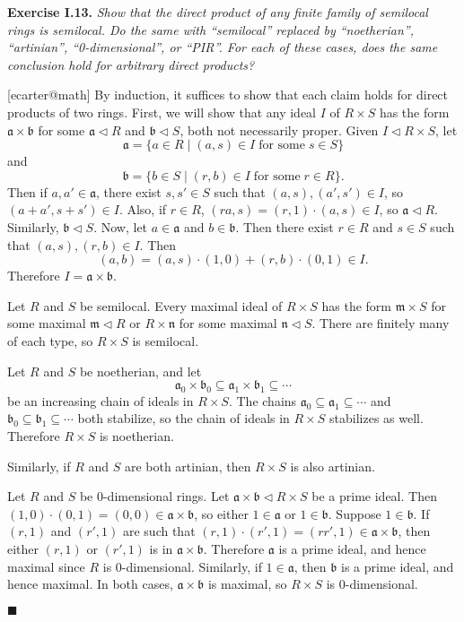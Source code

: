 \documentclass{article}
\makeatletter
\newcommand\<{\triangleleft}
\renewcommand{\a}{\ensuremath{\mathfrak{a}}}
\newcommand{\m}{\ensuremath{\mathfrak{m}}}
\newenvironment{exercise}[1]{\gdef\currentEx{#1}\begin{trivlist}\item[]%
                \textbf{Exercise #1.} \it}{\end{trivlist}}
\newenvironment{solution}[1]{\def\x{#1}\begin{trivlist}\item[]\hspace*{-.5em}[\x]}
                {\hspace*{\fill} $\blacksquare$
                \protected@write0{}{\currentEx, \x}
                \end{trivlist}}
\makeatother
\begin{document}
 \begin{exercise}{I.13}
  Show that the direct product of any finite family of semilocal rings is semilocal.  Do
  the same with ``semilocal'' replaced by ``noetherian'', ``artinian'', ``0-dimensional'',
  or ``PIR''.  For each of these cases, does the same conclusion hold for \emph{arbitrary}
  direct products?
 \end{exercise}

 \begin{solution}{ecarter@math}
   By induction, it suffices to show that each claim holds for direct products of two
   rings.  First, we will show that any ideal $I$ of $R\times S$ has the form
   $\a\times\mathfrak{b}$ for some $\a\< R$ and $\mathfrak{b}\< S$, both not
   necessarily proper.  Given $I\< R\times S$, let
   \[
           \a=\{ a\in R\mid (a,s)\in I\;\text{for some}\; s\in S\}
   \]
   and
   \[
           \mathfrak{b} = \{b\in S\mid (r,b)\in I\;\text{for some}\; r\in R\}.
   \]
   Then if $a,a'\in\a$, there exist $s,s'\in S$ such that $(a,s),(a',s')\in I$,
   so $(a+a',s+s')\in I$.  Also, if $r\in R$, $(ra,s)=(r,1)\cdot (a,s)\in I$, so
   $\a\< R$.  Similarly, $\mathfrak{b}\< S$.  Now, let $a\in\a$ and
   $b\in\mathfrak{b}$.  Then there exist $r\in R$ and $s\in S$ such that
   $(a,s),(r,b)\in I$.  Then
   \[
           (a,b) = (a,s)\cdot (1,0) + (r,b)\cdot (0,1) \in I.
   \]
   Therefore $I=\a\times\mathfrak{b}$.

   Let $R$ and $S$ be semilocal.  Every maximal ideal of $R\times S$ has the form
   $\m\times S$ for some maximal $\m\< R$ or $R\times\mathfrak{n}$ for some maximal
   $\mathfrak{n}\< S$.  There are finitely many of each type, so $R\times S$ is
   semilocal.

   Let $R$ and $S$ be noetherian, and let
   \[
           \a_0\times\mathfrak{b}_0
                   \subseteq \a_1\times\mathfrak{b}_1
                   \subseteq\cdots
   \]
   be an increasing chain of ideals in $R\times S$.  The chains
   $\a_0\subseteq\a_1\subseteq\cdots$ and
   $\mathfrak{b}_0\subseteq\mathfrak{b}_1\subseteq\cdots$ both stabilize,
   so the chain of ideals in $R\times S$ stabilizes as well.  Therefore $R\times S$ is
   noetherian.

   Similarly, if $R$ and $S$ are both artinian, then $R\times S$ is also artinian.

   Let $R$ and $S$ be 0-dimensional rings.  Let $\a\times\mathfrak{b}\< R\times S$ be
   a prime ideal.  Then $(1,0)\cdot (0,1)=(0,0)\in\a\times\mathfrak{b}$, so either
   $1\in\a$ or $1\in\mathfrak{b}$.  Suppose $1\in\mathfrak{b}$.  If $(r,1)$ and
   $(r',1)$ are such that $(r,1)\cdot (r',1)=(rr',1)\in\a\times\mathfrak{b}$, then
   either $(r,1)$ or $(r',1)$ is in $\a\times\mathfrak{b}$.  Therefore $\a$ is a
   prime ideal, and hence maximal since $R$ is 0-dimensional.  Similarly, if
   $1\in\a$, then $\mathfrak{b}$ is a prime ideal, and hence maximal.  In both cases,
   $\a\times\mathfrak{b}$ is maximal, so $R\times S$ is 0-dimensional.


\end{solution}
\end{document}
